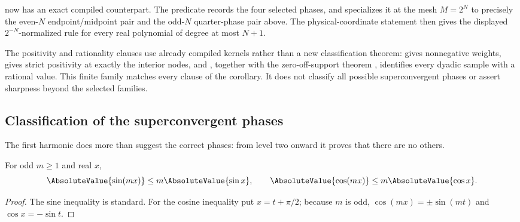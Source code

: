 \begin{statusbox}
 now has an exact compiled
counterpart.  The predicate
 records the four selected
phases, and
 specializes it at
the mesh $M=2^N$ to precisely the even-$N$ endpoint/midpoint pair and the
odd-$N$ quarter-phase pair above.  The physical-coordinate statement
then gives the displayed $2^{-N}$-normalized rule for every real polynomial
of degree at most $N+1$.

The positivity and rationality clauses use already compiled kernels rather
than a new classification theorem:  gives
nonnegative weights,
 gives strict positivity at exactly the
interior nodes, and , together with the
zero-off-support theorem ,
identifies every dyadic sample with a rational value.  This finite family
matches every clause of the corollary.  It does not classify all possible
superconvergent phases or assert sharpness beyond the selected families.
\end{statusbox}

\subsection{Classification of the superconvergent phases}

The first harmonic does more than suggest the correct phases: from level two onward it proves that there are no others.

\begin{lemma}
\label{is:p3:lem:odd-trig-factor}
For odd $m\ge1$ and real $x$,
\begin{equation}
 \AbsoluteValue{\sin(mx)}\le m\AbsoluteValue{\sin x},
 \qquad
 \AbsoluteValue{\cos(mx)}\le m\AbsoluteValue{\cos x}.
 \label{is:p3:eq:odd-trig-factor}
\end{equation}
\end{lemma}

\begin{proof}
The sine inequality is standard.  For the cosine inequality put $x=t+\pi/2$; because $m$ is odd, $\cos(mx)=\pm\sin(mt)$ and $\cos x=-\sin t$.
\end{proof}

